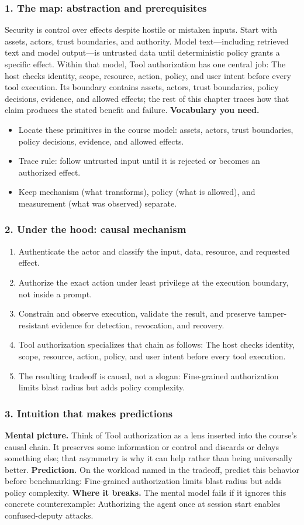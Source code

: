 \subsubsection*{1. The map: abstraction and prerequisites}
Security is control over effects despite hostile or mistaken inputs. Start with assets, actors, trust boundaries, and authority. Model text—including retrieved text and model output—is untrusted data until deterministic policy grants a specific effect.
Within that model, Tool authorization has one central job: The host checks identity, scope, resource, action, policy, and user intent before every tool execution. Its boundary contains assets, actors, trust boundaries, policy decisions, evidence, and allowed effects; the rest of this chapter traces how that claim produces the stated benefit and failure.
\textbf{Vocabulary you need.}\begin{itemize}
\item Locate these primitives in the course model: assets, actors, trust boundaries, policy decisions, evidence, and allowed effects.
\item Trace rule: follow untrusted input until it is rejected or becomes an authorized effect.
\item Keep mechanism (what transforms), policy (what is allowed), and measurement (what was observed) separate.
\end{itemize}
\subsubsection*{2. Under the hood: causal mechanism}\begin{enumerate}
\item Authenticate the actor and classify the input, data, resource, and requested effect.
\item Authorize the exact action under least privilege at the execution boundary, not inside a prompt.
\item Constrain and observe execution, validate the result, and preserve tamper-resistant evidence for detection, revocation, and recovery.
\item Tool authorization specializes that chain as follows: The host checks identity, scope, resource, action, policy, and user intent before every tool execution.
\item The resulting tradeoff is causal, not a slogan: Fine-grained authorization limits blast radius but adds policy complexity.
\end{enumerate}
\subsubsection*{3. Intuition that makes predictions}
\textbf{Mental picture.} Think of Tool authorization as a lens inserted into the course's causal chain. It preserves some information or control and discards or delays something else; that asymmetry is why it can help rather than being universally better.
\textbf{Prediction.} On the workload named in the tradeoff, predict this behavior before benchmarking: Fine-grained authorization limits blast radius but adds policy complexity.
\textbf{Where it breaks.} The mental model fails if it ignores this concrete counterexample: Authorizing the agent once at session start enables confused-deputy attacks.
